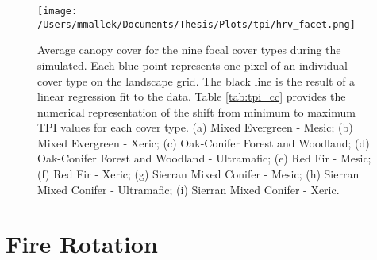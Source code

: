 \begin{figure}[!htbp]
\centering
\texttt{[image: /Users/mmallek/Documents/Thesis/Plots/tpi/hrv\_facet.png]}
\caption{Average canopy cover for the nine focal cover types during the simulated. Each blue point represents one pixel of an individual cover type on the landscape grid. The black line is the result of a linear regression fit to the data. Table \ref{tab:tpi_cc} provides the numerical representation of the shift from minimum to maximum TPI values for each cover type. (a) Mixed Evergreen - Mesic; (b) Mixed Evergreen - Xeric; (c) Oak-Conifer Forest and Woodland; (d) Oak-Conifer Forest and Woodland - Ultramafic; (e) Red Fir - Mesic; (f) Red Fir - Xeric; (g) Sierran Mixed Conifer - Mesic; (h) Sierran Mixed Conifer - Ultramafic; (i) Sierran Mixed Conifer - Xeric.} 
\label{fig:tpi_cc}
\end{figure}




\section{Fire Rotation}

